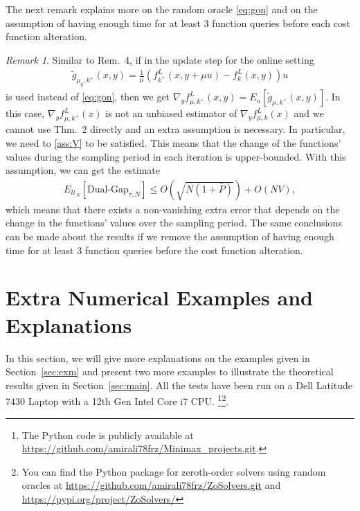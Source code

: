 \documentclass{article}
\theoremstyle{plain}
\theoremstyle{definition}
\theoremstyle{remark}
\newtheorem{remark}[theorem]{Remark}
\begin{document}
 
 The next remark explains more on the random oracle \eqref{eq:gon} and on the assumption of having enough time for at least 3 function queries before each cost function alteration.
 \begin{remark}\label{rem:fun_change}
     Similar to \cite{farzin2025minimisationsubmodular} Rem.~4,  if in the update step for the online setting
    \begin{align*}
    \tilde{g}_{\mu_y,k^+}(x,y) = \tfrac{1}{\mu} (f^L_{k^+}(x,y+\mu u)-f^L_{k}(x,y)) u
\end{align*}
    is used instead of \eqref{eq:gon}, then we get $\nabla_y f^L_{\mu,k^+}(x,y) = E_u[\tilde{g}_{\mu,k^+}(x,y)].$ In this case, $\nabla_y f^L_{\mu,k^+}(x)$ is not an unbiased estimator of $\nabla_y f^L_{\mu,k}(x)$ and we cannot use \cite{nesterov_random_2017} Thm.~2 directly and an extra assumption is necessary. In particular, we need to \eqref{ass:V} to be satisfied. This means that the change of the functions' values during the sampling period in each iteration is upper-bounded. With this assumption, we can get the estimate
    \begin{align}\label{eq:eqonrem}
	E_{\mathcal{U}_{N}}[\text{Dual-Gap}_{\tau,N} ]\leq O(\sqrt{N(1+\bar
    {P})}) + O(NV),
	\end{align}
    which means that there exists a non-vanishing extra error that depends on the change in the functions' values over the sampling period. The same conclusions can be made about the results if we remove the assumption of having enough time for at least 3 function queries before the cost function alteration.
\end{remark}



\section{Extra Numerical Examples and Explanations}\label{app:exm}
In this section, we will give more explanations on the examples given in Section~\ref{sec:exm} and present two more examples to illustrate the theoretical results given in Section~\ref{sec:main}. All the tests have been run on a Dell Latitude 7430 Laptop with a 12th Gen Intel Core i7 CPU.
\footnote{The Python code is publicly available at \url{https://github.com/amirali78frz/Minimax_projects.git}.}\footnote{You can find the Python package for zeroth-order solvers using random oracles at \url{https://github.com/amirali78frz/ZoSolvers.git} and \url{https://pypi.org/project/ZoSolvers/}}.
\end{document}
